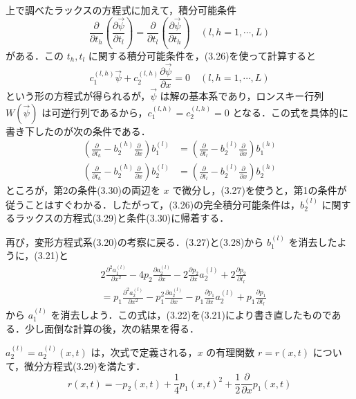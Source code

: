 \begin{story}
上で調べたラックスの方程式に加えて，積分可能条件
\begin{equation*}
    \frac{\partial}{\partial t_h}\left(\frac{\partial \vec{\psi}}{\partial t_l}\right) = \frac{\partial}{\partial t_l}\left(\frac{\partial \vec{\psi}}{\partial t_h}\right) \quad (l, h = 1, \cdots, L)
\end{equation*}
がある．この $t_h, t_l$ に関する積分可能条件を，(3.26)を使って計算すると
\begin{equation*}
    c_1^{(l,h)}\vec{\psi} + c_2^{(l,h)}\frac{\partial \vec{\psi}}{\partial x} = 0 \quad (l, h = 1, \cdots, L)
\end{equation*}
という形の方程式が得られるが，$\vec{\psi}$ は解の基本系であり，ロンスキー行列 $W(\vec{\psi})$ は可逆行列であるから，$c_1^{(l,h)} = c_2^{(l,h)} = 0$ となる．この式を具体的に書き下したのが次の条件である．
\begin{align}
    \left( \frac{\partial}{\partial t_h} - b_2^{(h)}\frac{\partial}{\partial x} \right) b_1^{(l)} &= \left( \frac{\partial}{\partial t_l} - b_2^{(l)}\frac{\partial}{\partial x} \right) b_1^{(h)} \nonumber \\
    \left( \frac{\partial}{\partial t_h} - b_2^{(h)}\frac{\partial}{\partial x} \right) b_2^{(l)} &= \left( \frac{\partial}{\partial t_l} - b_2^{(l)}\frac{\partial}{\partial x} \right) b_2^{(h)} \label{eq:3.30}
\end{align}
ところが，第2の条件(3.30)の両辺を $x$ で微分し，(3.27)を使うと，第1の条件が従うことはすぐわかる．したがって，(3.26)の完全積分可能条件は，$b_2^{(l)}$ に関するラックスの方程式(3.29)と条件(3.30)に帰着する．

再び，変形方程式系(3.20)の考察に戻る．(3.27)と(3.28)から $b_1^{(l)}$ を消去したように，(3.21)と
\begin{align}
    & 2\frac{\partial^2 a_1^{(l)}}{\partial x^2} - 4p_2\frac{\partial a_2^{(l)}}{\partial x} - 2\frac{\partial p_2}{\partial x}a_2^{(l)} + 2\frac{\partial p_2}{\partial t_l} \nonumber \\
    &= p_1\frac{\partial^2 a_2^{(l)}}{\partial x^2} - p_1^2\frac{\partial a_2^{(l)}}{\partial x} - p_1\frac{\partial p_1}{\partial x}a_2^{(l)} + p_1\frac{\partial p_1}{\partial t_l} \label{eq:3.31}
\end{align}
から $a_1^{(l)}$ を消去しよう．この式は，(3.22)を(3.21)により書き直したものである．少し面倒な計算の後，次の結果を得る．

\begin{proposition}[3.6]
$a_2^{(l)} = a_2^{(l)}(x,t)$ は，次式で定義される，$x$ の有理関数 $r = r(x,t)$ について，微分方程式(3.29)を満たす．
\begin{equation}
    r(x,t) = -p_2(x,t) + \frac{1}{4}p_1(x,t)^2 + \frac{1}{2}\frac{\partial}{\partial x}p_1(x,t) \label{eq:3.32}
\end{equation}
\end{proposition}
\end{story}

